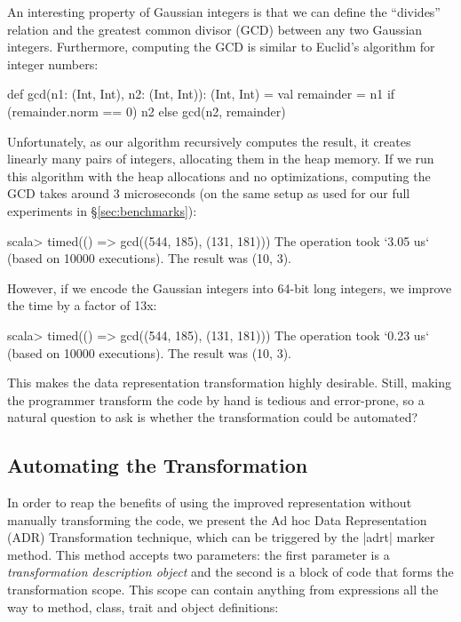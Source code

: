 An interesting property of Gaussian integers is that we can define the
``divides'' relation and the greatest common divisor (GCD) between any
two Gaussian integers. Furthermore, computing the GCD is similar to
Euclid's algorithm for integer numbers:

\begin{lstlisting-nobreak}
def gcd(n1: (Int, Int), n2: (Int, Int)): (Int, Int) = {
  val remainder = n1 %
  if (remainder.norm == 0) n2 else gcd(n2, remainder)
}
\end{lstlisting-nobreak}

Unfortunately, as our algorithm recursively computes the result, it creates linearly many pairs of integers, allocating them in the heap memory. If we run this algorithm with the heap allocations and no optimizations, computing the GCD takes around 3 microseconds (on the same setup as used for our full experiments in \S\ref{sec:benchmarks}):

\begin{lstlisting-nobreak}
scala> timed(() => gcd((544, 185), (131, 181)))
The operation took `3.05 us` (based on 10000 executions).
The result was (10, 3).
\end{lstlisting-nobreak}

However, if we encode the Gaussian integers into 64-bit long integers, we improve the time by a factor of 13x:

\begin{lstlisting-nobreak}
scala> timed(() => gcd((544, 185), (131, 181)))
The operation took `0.23 us` (based on 10000 executions).
The result was (10, 3).
\end{lstlisting-nobreak}

This makes the data representation transformation highly desirable. Still, making the programmer transform the code by hand is tedious and error-prone, so a natural question to ask is whether the transformation could be automated?

\subsection{Automating the Transformation}
\label{sec:automating}

In order to reap the benefits of using the improved representation
without manually transforming the code, we present the Ad hoc Data
Representation (ADR) Transformation technique, which can be triggered
by the |adrt| marker method. This method accepts two parameters: the
first parameter is a \emph{transformation description object} and the
second is a block of code that forms the transformation scope. This
scope can contain anything from expressions all the way to method, class,
trait and object definitions:

